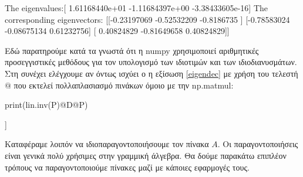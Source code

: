 \vspace*{-0.7cm}
\begin{codeout}
The eigenvalues:[ 1.61168440e+01 -1.11684397e+00 -3.38433605e-16]
The corresponding eigenvectors:
[[-0.23197069 -0.52532209 -0.8186735 ]
 [-0.78583024 -0.08675134  0.61232756]
 [ 0.40824829 -0.81649658  0.40824829]]
\end{codeout}
\gr
Εδώ παρατηρούμε κατά τα γνωστά ότι η {\en numpy} χρησιμοποιεί αριθμητικές προσεγγιστικές μεθόδους για τον υπολογισμό των ιδιοτιμών και των ιδιοδιανυσμάτων. Στη συνέχει ελέγχουμε αν όντως ισχύει ο η εξίσωση \eqref{eigendec} με χρήση του τελεστή $@$ που εκτελεί πολλαπλασιασμό πινάκων όμοιο με την {\en np.matmul}:
\en
\begin{python}
print(lin.inv(P)@D@P)
\end{python}
\vspace*{-0.7cm}
\begin{codeout}
[[1. 4. 7.]
 [2. 5. 8.]
 [3. 6. 9.]]
\end{codeout}
\gr

Καταφέραμε λοιπόν να ιδιοπαραγοντοποιήσουμε τον πίνακα $Α$. Οι παραγοντοποιήσεις είναι γενικά πολύ χρήσιμες στην γραμμική άλγεβρα. Θα δούμε παρακάτω επιπλέον τρόπους να παραγοντοποιούμε πίνακες μαζί με κάποιες εφαρμογές τους.